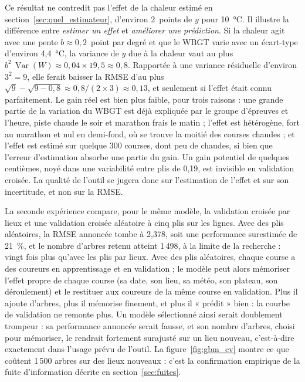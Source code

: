 \documentclass[11pt,a4paper]{article}
\DeclareMathOperator{\Var}{Var}
\begin{document}
Ce résultat ne contredit pas l'effet de la chaleur estimé en section~\ref{sec:quel_estimateur}, d'environ 2~points de
$y$ pour 10~°C. Il illustre la différence entre \emph{estimer un effet} et \emph{améliorer une prédiction}. Si la
chaleur agit avec une pente $b \approx 0{,}2$~point par degré et que le WBGT varie avec un écart-type d'environ
4,4~°C, la variance de $y$ due à la chaleur vaut au plus $b^2\,\Var(W) \approx 0{,}04 \times 19{,}5 \approx 0{,}8$.
Rapportée à une variance résiduelle d'environ $3^2 = 9$, elle ferait baisser la RMSE d'au plus
$\sqrt{9} - \sqrt{9 - 0{,}8} \approx 0{,}8/(2 \times 3) \approx 0{,}13$, et seulement si l'effet était connu
parfaitement. Le gain réel est bien plus faible, pour trois raisons : une grande partie de la variation du WBGT est
déjà expliquée par le groupe d'épreuves et l'heure, piste chaude le soir et marathon frais le matin ; l'effet est
hétérogène, fort au marathon et nul en demi-fond, où se trouve la moitié des courses chaudes ; et l'effet est estimé
sur quelque 300 courses, dont peu de chaudes, si bien que l'erreur d'estimation absorbe une partie du gain. Un gain
potentiel de quelques centièmes, noyé dans une variabilité entre plis de 0,19, est invisible en validation croisée.
La qualité de l'outil se jugera donc sur l'estimation de l'effet et sur son incertitude, et non sur la RMSE.

La seconde expérience compare, pour le même modèle, la validation croisée par lieux et une validation croisée
aléatoire à cinq plis sur les lignes. Avec des plis aléatoires, la RMSE annoncée tombe à 2,378, soit une performance
surestimée de 21~\%, et le nombre d'arbres retenu atteint 1\,498, à la limite de la recherche : vingt fois plus qu'avec
les plis par lieux. Avec des plis aléatoires, chaque course a des coureurs en apprentissage et en validation ; le
modèle peut alors mémoriser l'effet propre de chaque course (sa date, son lieu, sa météo, son plateau, son déroulement)
et le restituer aux coureurs de la même course en validation. Plus il ajoute d'arbres, plus il mémorise finement, et
plus il « prédit » bien : la courbe de validation ne remonte plus. Un modèle sélectionné ainsi serait doublement
trompeur : sa performance annoncée serait fausse, et son nombre d'arbres, choisi pour mémoriser, le rendrait fortement
surajusté sur un lieu nouveau, c'est-à-dire exactement dans l'usage prévu de l'outil. La
figure~\ref{fig:gbm_cv} montre ce que coûtent 1\,500 arbres sur des lieux nouveaux : c'est la confirmation empirique
de la fuite d'information décrite en section~\ref{sec:fuites}.
\end{document}
